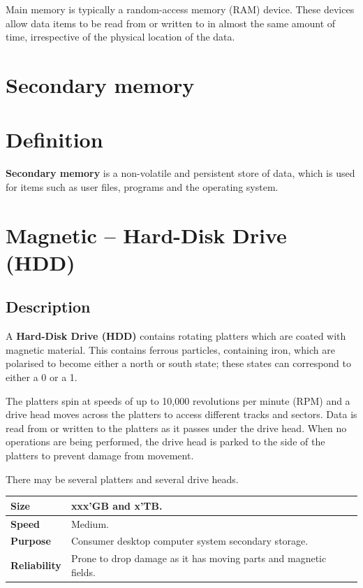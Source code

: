 \documentclass[a4paper]{systems-software}
\begin{document}
Main memory is typically a random-access memory (RAM) device. These devices allow data items to be read from or written to in almost the same amount of time, irrespective of the physical location of the data.


\newpage

\section{Secondary memory}

\section*{Definition}

\textbf{Secondary memory} is a non-volatile and persistent store of data, which is used for items such as user files, programs and the operating system.


\section*{Magnetic -- Hard-Disk Drive (HDD)}

\subsection*{Description}

A \textbf{Hard-Disk Drive (HDD)} contains rotating platters which are coated with magnetic material. This contains ferrous particles, containing iron, which are polarised to become either a north or south state; these states can correspond to either a 0 or a 1.

The platters spin at speeds of up to 10,000 revolutions per minute (RPM) and a drive head moves across the platters to access different tracks and sectors. Data is read from or written to the platters as it passes under the drive head. When no operations are being performed, the drive head is parked to the side of the platters to prevent damage from movement.

There may be several platters and several drive heads.

\begin{longtabu} to \textwidth {| X[1,l] | X[6,l] |}
    \hline
    \textbf{Size} & xxx’GB and x’TB.
	\\ \hline
	\textbf{Speed} & Medium.
	\\ \hline
	\textbf{Purpose} & Consumer desktop computer system secondary storage.
	\\ \hline
	\textbf{Reliability} & Prone to drop damage as it has moving parts and magnetic fields.
	\\ \hline
\end{longtabu}
\end{document}
